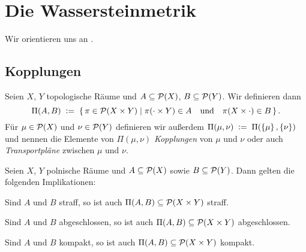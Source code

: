 \documentclass[../main/main.tex]{subfiles}
\begin{document}
	
	\section{Die Wassersteinmetrik}
	
	Wir orientieren uns an \cite{Villani.2009}.
	
	\subsection{Kopplungen}
	
	\begin{Definition}[Kopplung]
		Seien $X$, $Y$ topologische Räume und $A \subseteq \mathcal{P}(X)$, $B \subseteq \mathcal{P}(Y)$. Wir definieren dann
		\[ \Pi(A, B) \; \vcentcolon = \; \left\{\, \pi \in \mathcal{P}(X \times Y) \; \middle| \; \pi(\cdot \times Y) \in A \quad \text{und} \quad \pi(X \times \cdot) \in B \,\right\} \text{.}\]
		Für $\mu \in \mathcal{P}(X)$ und $\nu \in \mathcal{P}(Y)$ definieren wir außerdem $\Pi(\mu, \nu) \; \vcentcolon = \; \Pi(\left\{\mu\right\}, \left\{\nu\right\})$ und nennen die
		Elemente von $\Pi(\mu, \nu)$ \emph{Kopplungen} von $\mu$ und $\nu$ oder auch \emph{Transportpläne} zwischen $\mu$ und $\nu$.
	\end{Definition}

	\begin{Hilfssatz}
		\label{lem:couplingsproperties}
		Seien $X$, $Y$ polnische Räume und $A \subseteq \mathcal{P}(X)$ sowie $B \subseteq \mathcal{P}(Y)$. Dann gelten die folgenden Implikationen:
		\begin{enumeratethm}
			\item Sind $A$ und $B$ straff, so ist auch $\Pi(A, B) \subseteq \mathcal{P}(X \times Y)$ straff.
			\item Sind $A$ und $B$ abgeschlossen, so ist auch $\Pi(A, B) \subseteq \mathcal{P}(X \times Y)$ abgeschlossen.
			\item Sind $A$ und $B$ kompakt, so ist auch $\Pi(A, B) \subseteq \mathcal{P}(X \times Y)$ kompakt.
		\end{enumeratethm}
	\end{Hilfssatz}
\end{document}
